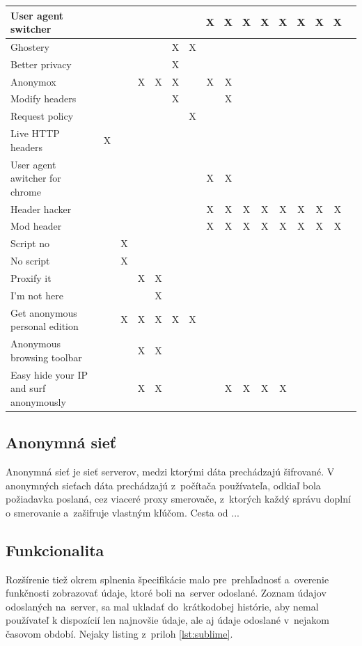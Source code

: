 \begin{table}[!htbp]
\begin{center}
\begin{tabular}{p{4cm}|c|c|c|c|c|c|c|c|c|c|c|c|c|c|c}
User agent switcher & & & & & &  & X & X & X & X & X & X & X & X  \\ \hline
Ghostery &  && & & X & X &  &  & & & & & & \\  \hline
Better privacy && &  & & X &  &  &  & & & & & & \\  \hline
Anonymox &  && X & X & X &  & X & X & & & & & & \\  \hline
Modify headers & & &  &  & X &  &  & X &  &  &  & & &  \\  \hline
Request policy & & &  &  & & X  &  &  &  &  &  & & &   \\  \hline
Live HTTP headers & X& &  &  & &  &  &  &  &  &  & & &   \\  \hline
User agent awitcher for chrome & & &  &  & &  & X & X &  &  &  & & &   \\  \hline
Header hacker & & &  &  & &  & X & X & X & X & X & X & X & X	\\  \hline
Mod header & & &  &  & &  & X & X & X & X & X & X & X & X	\\  \hline
Script no & &X &  &  & &  &  &  &  &  &  &  &  &	 \\  \hline
No script & &X &  &  & &  &  &  &  &  &  &  &  &	 \\  \hline
Proxify it & & &X  & X & &  &  &  &  &  &  &  &  &	 \\  \hline
I'm not here & & &  & X & &  &  &  &  &  &  &  &  &	 \\  \hline
Get anonymous personal edition & &X &X &X &X&X &  &  &  &  &  &  &  &	 \\  \hline
Anonymous browsing toolbar & & & X & X & &  &  &  &  &  &  &  &  &	 \\  \hline
Easy hide your IP and surf anonymously & & & X & X& &  &  & X & X & X & X &  &  &	 \\  \hline
\end{tabular}
\end{center}
\end{table}

\subsection{Anonymná sieť}
\noindent Anonymná sieť je sieť serverov, medzi ktorými dáta prechádzajú šifrované. V anonymných sieťach dáta prechádzajú z~počítača používateľa, odkiaľ bola požiadavka poslaná, cez viaceré proxy smerovače, z~ktorých každý správu doplní o smerovanie a~zašifruje vlastným kľúčom. Cesta od ...


\subsection{Funkcionalita}
\noindent  Rozšírenie tiež okrem splnenia špecifikácie malo pre~prehľadnosť a~overenie funkčnosti zobrazovať údaje, ktoré boli na~server odoslané. Zoznam údajov odoslaných na~server, sa mal ukladať do~krátkodobej histórie, aby nemal používateľ k dispozícií len najnovšie údaje, ale aj údaje odoslané v~nejakom časovom období. Nejaky listing z~priloh \ref{lst:sublime}.


